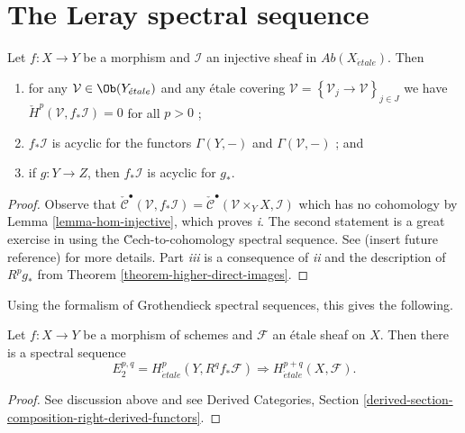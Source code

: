 \section{The Leray spectral sequence}
\label{section-leray}

\begin{lemma}
\label{lemma-prepare-leray}
Let $f: X\to Y$ be a morphism and $\mathcal{I}$ an injective sheaf in
$\textit{Ab}(X_{\acute{e}tale})$. Then
\begin{enumerate}
\item
for any $\mathcal{V}\in\Ob(Y_{\acute{e}tale})$ and any \'etale covering
$\mathcal{V}=\left\{\mathcal{V}_j\to \mathcal{V}\right\}_{j\in J}$ we have
$\check H^p(\mathcal{V}, f_*\mathcal{I}) = 0$ for all $p>0$ ;
\item
$f_*\mathcal{I}$ is acyclic for the functors $\Gamma(Y, -)$ and
$\Gamma(\mathcal{V}, -)$ ; and
\item
if $g: Y\to Z$, then $f_*\mathcal{I}$ is acyclic for $g_*$.
\end{enumerate}
\end{lemma}

\begin{proof}
Observe that $\check{\mathcal{C}}^\bullet(\mathcal{V}, f_*\mathcal{I}) =
\check{\mathcal{C}}^\bullet(\mathcal{V} \times_Y X, \mathcal{I})$ which has no
cohomology by Lemma \ref{lemma-hom-injective}, which proves {\it i}. The
second statement is a great exercise in using the \u Cech-to-cohomology
spectral sequence. See (insert future reference) for more details. Part {\it
iii} is a consequence of {\it ii} and the description of $R^pg_*$ from
Theorem \ref{theorem-higher-direct-images}.
\end{proof}

\noindent
Using the formalism of Grothendieck spectral sequences, this gives the
following.

\begin{proposition}
\label{proposition-leray}
Let $f: X \to Y$ be a morphism of schemes and $\mathcal{F}$ an \'etale sheaf on
$X$. Then there is a spectral sequence
$$
E_2^{p, q} = H_{\acute{e}tale}^p(Y, R^qf_*\mathcal{F}) \Rightarrow
H_{\acute{e}tale}^{p+q}(X, \mathcal{F}).
$$
\end{proposition}

\begin{proof}
See discussion above and see
Derived Categories, Section
\ref{derived-section-composition-right-derived-functors}.
\end{proof}









